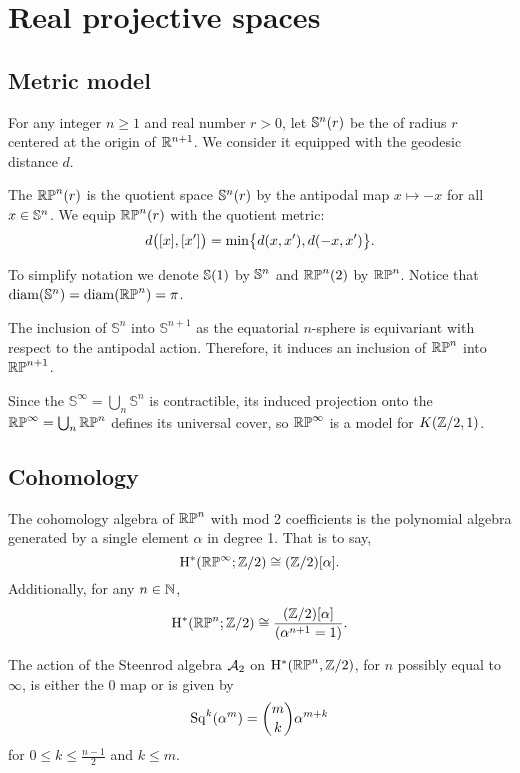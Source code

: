 
\section{Real projective spaces}

\subsection{Metric model}

For any integer $n \geq 1$ and real number $r > 0$, let $\bS^n(r)$ be the  of radius $r$ centered at the origin of $\R^{n+1}$.
We consider it equipped with the geodesic distance $d$.

The  $\rp^n(r)$ is the quotient space $\bS^n(r)$ by the antipodal map $x \mapsto -x$ for all $x \in \bS^n$.
We equip $\rp^n(r)$ with the quotient metric:
\[
d\big([x],[x']\big) =
\min\set[\big]{d(x, x'), d(-x, x')}.
\]

To simplify notation we denote $\bS(1)$ by $\bS^n$ and $\rp^n(2)$ by $\rp^n$.
Notice that $\diam(\bS^n) = \diam(\rp^n) = \pi$.

The inclusion of \(\mathbb{S}^n\) into \(\mathbb{S}^{n+1}\) as the equatorial $n$-sphere is equivariant with respect to the antipodal action.
Therefore, it induces an inclusion of \(\rp^n\) into \(\rp^{n+1}\).

Since the  \(\mathbb{S}^\infty = \bigcup_n \mathbb{S}^n\) is contractible, its induced projection onto the  $\rp^\infty = \bigcup_n \rp^n$ defines its universal cover, so $\rp^\infty$ is a model for \(K(\Z/2, 1)\).

\subsection{Cohomology}

The cohomology algebra of $\rp^n$ with mod 2 coefficients is the polynomial algebra generated by a single element $\alpha$ in degree 1.
That is to say,
\[
\rH^\ast(\rp^\infty; \Z/2) \cong (\Z/2)[\alpha].
\]
Additionally, for any $n \in \N$,
\[
\rH^\ast(\rp^n; \Z/2) \cong \frac{(\Z/2)[\alpha]}{(\alpha^{n+1} = 1)}.
\]

The action of the Steenrod algebra $\cA_2$ on $\rH^*(\rp^n, \Z/2)$, for $n$ possibly equal to $\infty$, is either the 0 map or is given by
\[
\Sq^k(\alpha^m) = \binom{m}{k}\alpha^{m+k}
\]
for $0 \leq k \leq \frac{n-1}{2}$ and $k \leq m$.

